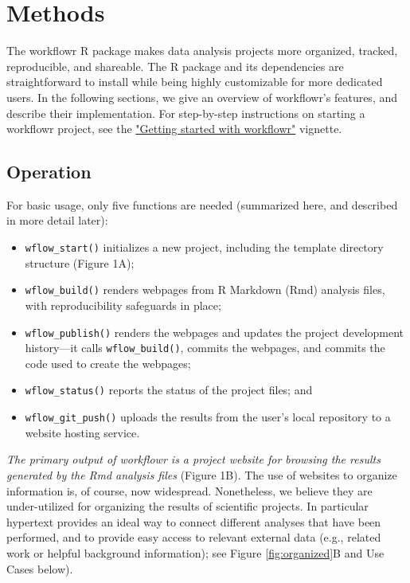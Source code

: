 \documentclass[9pt,a4paper]{extarticle}
\begin{document}
\section*{Methods}

The workflowr R package makes data analysis projects more organized,
tracked, reproducible, and shareable. The R package and its dependencies
are straightforward to install while being highly customizable for more
dedicated users. In the following sections, we give an overview of
workflowr's features, and describe their implementation. For
step-by-step instructions on starting a workflowr project, see the
\href{https://jdblischak.github.io/workflowr/articles/wflow-01-getting-started.html}{"Getting
started with workflowr"} vignette.

\subsection*{Operation}

For basic usage, only five functions are needed (summarized here, and
described in more detail later):

\begin{itemize}

\item \texttt{wflow\_start()} initializes a new project, including the template
directory structure (Figure 1A);

\item \texttt{wflow\_build()} renders webpages from R Markdown (Rmd) analysis
files, with reproducibility safeguards in place;

\item \texttt{wflow\_publish()} renders the webpages and updates the project
development history—it calls \texttt{wflow\_build()}, commits the webpages, and
commits the code used to create the webpages;

\item \texttt{wflow\_status()} reports the status of the project files; and

\item \texttt{wflow\_git\_push()} uploads the results from the user's local
repository to a website hosting service.

\end{itemize}

\textit{The primary output of workflowr is a project website for
browsing the results generated by the Rmd analysis files} (Figure 1B).
The use of websites to organize information is, of course, now
widespread. Nonetheless, we believe they are under-utilized for
organizing the results of scientific projects. In particular hypertext
provides an ideal way to connect different analyses that have been
performed, and to provide easy access to relevant external data (e.g.,
related work or helpful background information); see Figure \ref{fig:organized}B and Use
Cases below).
\end{document}
